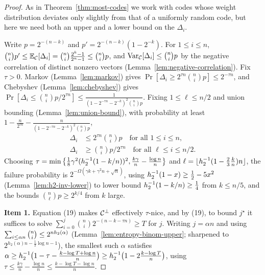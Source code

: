 \begin{proof}
  As in Theorem~\ref{thm:most-codes} we work with codes whose weight
  distribution deviates only slightly from that of a uniformly random code, but
  here we need both an upper and a lower bound on the $\Delta_i$.

  Write $p = 2^{-(n-k)}$ and $p' = 2^{-(n-k)}(1 - 2^{-k})$. For $1 \leq i \leq n$,
  $\binom{n}{i}p' \leq \mathbb{E}_{\mathcal{C}}[\Delta_i] = \binom{n}{i}\frac{2^k-1}{2^n-1}\leq
  \binom{n}{i}p$, and $\operatorname{Var}_{\mathcal{C}}[\Delta_i]\leq \binom{n}{i}p$ by
  the negative correlation of distinct nonzero vectors
  (Lemma~\ref{lem:negative-correlation}). Fix $\tau > 0$. Markov
  (Lemma~\ref{lem:markov}) gives $\Pr[\Delta_i \geq 2^{\tau n}\binom{n}{i}p]\leq
  2^{-\tau n}$, and Chebyshev (Lemma~\ref{lem:chebyshev}) gives
  $\Pr[\Delta_i \leq \binom{n}{i}p/2^{\tau n}]\leq \frac{1}{(1 - 2^{-\tau n} -
  2^{-k})^2\binom{n}{i}p}$. Fixing $1 \leq \ell \leq n/2$ and union bounding
  (Lemma~\ref{lem:union-bound}), with probability at least $1 - \frac{n}{2^{\tau n}}
  - \frac{n}{(1 - 2^{-\tau n} - 2^{-k})^2\binom{n}{\ell}p}$,
  \begin{align}
    \Delta_i &\leq 2^{\tau n}\binom{n}{i}p \quad\text{for all } 1 \leq i \leq n,
      \tag{19}\\
    \Delta_i &\geq \binom{n}{i}p/2^{\tau n}\quad\text{for all } \ell\leq i\leq n/2.
      \tag{20}
  \end{align}
  Choosing $\tau = \min\big\{\frac18\gamma^2(h_2^{-1}(1 - k/n))^2,
  \frac{k\gamma}{n} - \frac{\log n}{n}\big\}$ and
  $\ell = \lfloor h_2^{-1}(1 - \frac23\frac{k}{n})n\rfloor$, the failure
  probability is $2^{-\Omega(\gamma k + \gamma^2 n + \sqrt n)}$, using
  $h_2^{-1}(1-x)\geq \frac12 - 5x^2$ (Lemma~\ref{lem:h2-inv-lower}) to lower
  bound $h_2^{-1}(1 - k/n)\geq \frac14$ from $k \leq n/5$, and the bounds
  $\binom{n}{\ell}p \geq 2^{k/4}$ from $k$ large.

  \textbf{Item 1.} Equation (19) makes $\mathcal{C}^\perp$ effectively $\tau$-nice,
  and by (19), to bound $j^\star$ it suffices to solve $\sum_{i=0}^j\binom{n}{i}
  2^{-(n-k-\tau n)}\geq T$ for $j$. Writing $j = \alpha n$ and using
  $\sum_{i\leq\alpha n}\binom{n}{i}\leq 2^{nh_2(\alpha)}$
  (Lemma~\ref{lem:entropy-binom-upper}; sharpened to $2^{h_2(\alpha)n - \frac12
  \log n - 1}$), the smallest such $\alpha$ satisfies $\alpha \geq
  h_2^{-1}\big(1 - \tau - \frac{k - \log T + \log n}{n}\big)\geq
  h_2^{-1}\big(1 - 2\frac{k - \log T}{n}\big)$, using $\tau \leq
  \frac{k\gamma}{n} - \frac{\log n}{n}\leq \frac{k - \log T - \log n}{n}$.


\end{proof}
